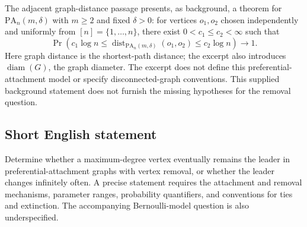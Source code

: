 \documentclass[11pt]{article}
\begin{document}
The adjacent graph-distance passage presents, as background, a theorem for \(\mathrm{PA}_n(m,\delta)\) with \(m\geq2\) and fixed \(\delta>0\): for vertices \(o_1,o_2\) chosen independently and uniformly from \([n]=\{1,\ldots,n\}\), there exist \(0<c_1\leq c_2<\infty\) such that
\[
\Pr\!\left(c_1\log n\leq \operatorname{dist}_{\mathrm{PA}_n(m,\delta)}(o_1,o_2)\leq c_2\log n\right)\longrightarrow1.
\]
Here graph distance is the shortest-path distance; the excerpt also introduces \(\operatorname{diam}(G)\), the graph diameter. The excerpt does not define this preferential-attachment model or specify disconnected-graph conventions. This supplied background statement does not furnish the missing hypotheses for the removal question.
\subsection{Short English statement}
Determine whether a maximum-degree vertex eventually remains the leader in preferential-attachment graphs with vertex removal, or whether the leader changes infinitely often. A precise statement requires the attachment and removal mechanisms, parameter ranges, probability quantifiers, and conventions for ties and extinction. The accompanying Bernoulli-model question is also underspecified.
\end{document}
